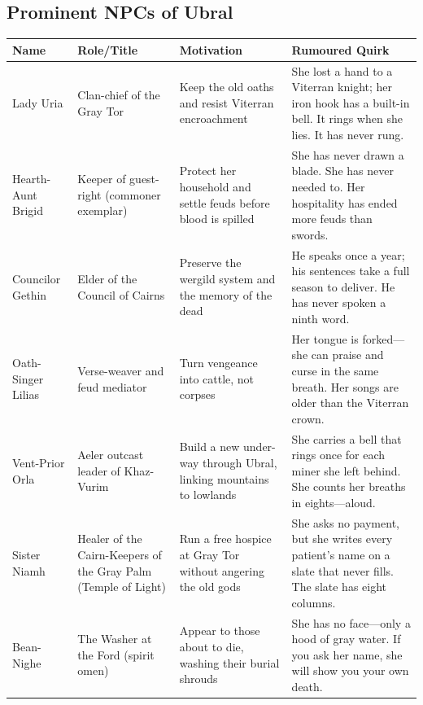 \subsection*{Prominent NPCs of Ubral}
\label{sec:ubral-npcs}
\begin{longtable}{|p{}|p{}|p{}|p{}|}
\hline
\textbf{Name} & \textbf{Role/Title} & \textbf{Motivation} & \textbf{Rumoured Quirk} \\
\hline
Lady Uria & Clan-chief of the Gray Tor & Keep the old oaths and resist Viterran encroachment & She lost a hand to a Viterran knight; her iron hook has a built-in bell. It rings when she lies. It has never rung. \\
\hline
Hearth-Aunt Brigid & Keeper of guest-right (commoner exemplar) & Protect her household and settle feuds before blood is spilled & She has never drawn a blade. She has never needed to. Her hospitality has ended more feuds than swords. \\
\hline
Councilor Gethin & Elder of the Council of Cairns & Preserve the wergild system and the memory of the dead & He speaks once a year; his sentences take a full season to deliver. He has never spoken a ninth word. \\
\hline
Oath-Singer Lilias & Verse-weaver and feud mediator & Turn vengeance into cattle, not corpses & Her tongue is forked---she can praise and curse in the same breath. Her songs are older than the Viterran crown. \\
\hline
Vent-Prior Orla & Aeler outcast leader of Khaz-Vurim & Build a new under-way through Ubral, linking mountains to lowlands & She carries a bell that rings once for each miner she left behind. She counts her breaths in eights---aloud. \\
\hline
Sister Niamh & Healer of the Cairn-Keepers of the Gray Palm (Temple of Light) & Run a free hospice at Gray Tor without angering the old gods & She asks no payment, but she writes every patient's name on a slate that never fills. The slate has eight columns. \\
\hline
Bean-Nighe & The Washer at the Ford (spirit omen) & Appear to those about to die, washing their burial shrouds & She has no face---only a hood of gray water. If you ask her name, she will show you your own death. \\
\hline
\end{longtable}

